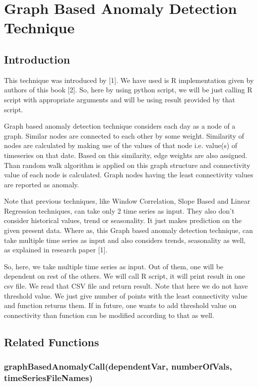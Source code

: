 \chapter{Graph Based Anomaly Detection Technique}

\section{Introduction}

This technique was introduced by [1]. We have used is R implementation given by 
authors of this book [2]. So, here by using python script, we will be just 
calling R script with appropriate arguments and will be using result provided 
by that script.

Graph based anomaly detection technique considers each day as a  node of a 
graph. Similar nodes are connected to each other by some weight. Similarity of 
nodes are calculated by making use of the values of that node i.e. value(s) of 
timeseries on that date. Based on this similarity, edge weights are also 
assigned. Than random walk algorithm is applied on this graph structure and 
connectivity value of each node is calculated. Graph nodes having the least 
connectivity values are reported as anomaly.

Note that previous techniques, like Window 
Correlation, Slope Based and Linear Regression techniques, can take only 2 time 
series as input. They also don't consider historical values, trend or 
seasonality. It just makes prediction on the given present data. Where as, this 
Graph based anomaly detection technique, can take multiple time series as input 
and also considers trends, seasonality as well, as explained in research paper 
[1].

So, here, we take multiple time series as input. Out of them, one will be 
dependent on rest of the others. We will call R script, it will print result in 
one csv file. We read that CSV file and return result. Note that here we do not 
have threshold value. We just give number of points with the least connectivity 
value and function returns them. If in future, one wants to add threshold value 
on connectivity than function can be modified according to that as well.

\section{Related Functions}

\subsection{graphBasedAnomalyCall(dependentVar, numberOfVals, 
timeSeriesFileNames)}


